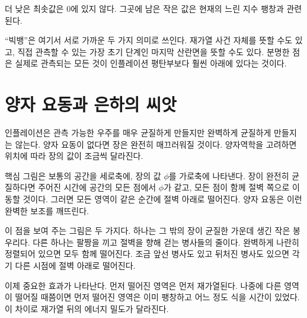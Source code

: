더 낮은 최솟값은 0에 있지 않다. 그곳에 남은 작은 값은 현재의 느린 지수 팽창과 관련된다.

\begin{classroomqa}
\end{classroomqa}

``빅뱅''은 여기서 서로 가까운 두 가지 의미로 쓰인다. 재가열 사건 자체를 뜻할 수도 있고, 직접 관측할 수 있는 가장 초기 단계인 마지막 산란면을 뜻할 수도 있다. 분명한 점은 실제로 관측되는 모든 것이 인플레이션 평탄부보다 훨씬 아래에 있다는 것이다.

\begin{classroomqa}
\end{classroomqa}

\section{양자 요동과 은하의 씨앗}

인플레이션은 관측 가능한 우주를 매우 균질하게 만들지만 완벽하게 균질하게 만들지는 않는다. 양자 요동이 없다면 장은 완전히 매끄러워질 것이다. 양자역학을 고려하면 위치에 따라 장의 값이 조금씩 달라진다.

핵심 그림은 보통의 공간을 세로축에, 장의 값 \(\phi\)를 가로축에 나타낸다. 장이 완전히 균질하다면 주어진 시간에 공간의 모든 점에서 \(\phi\)가 같고, 모든 점이 함께 절벽 쪽으로 이동할 것이다. 그러면 모든 영역이 같은 순간에 절벽 아래로 떨어진다. 양자 요동은 이런 완벽한 보조를 깨뜨린다.

이 점을 보여 주는 그림은 두 가지다. 하나는 그 밖의 장이 균질한 가운데 생긴 작은 봉우리다. 다른 하나는 팔짱을 끼고 절벽을 향해 걷는 병사들의 줄이다. 완벽하게 나란히 정렬되어 있으면 모두 함께 떨어진다. 조금 앞선 병사도 있고 뒤처진 병사도 있으면 각기 다른 시점에 절벽 아래로 떨어진다.

이제 중요한 효과가 나타난다. 먼저 떨어진 영역은 먼저 재가열된다. 나중에 다른 영역이 떨어질 때쯤이면 먼저 떨어진 영역은 이미 팽창하고 어느 정도 식을 시간이 있었다. 이 차이로 재가열 뒤의 에너지 밀도가 달라진다.

